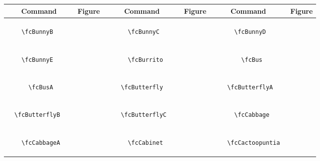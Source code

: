 \documentclass[x11names]{article}
\begin{document}
\begin{table}[H]\centering\begin{tabular}{|c|c|c|c|c|c|}\hline{\bf Command} & {\bf Figure} & {\bf Command} & {\bf Figure} & {\bf Command} & {\bf Figure}\\	\hline	&\multirow{5}{*}{	\fcBunnyB	[scale=0.4]} & &\multirow{5}{*}{	\fcBunnyC	[scale=0.4]} & &\multirow{5}{*}{	\fcBunnyD	[scale=0.4]}\\	& & & & & \\	& & & & & \\	\verb|	\fcBunnyB	| & & \verb|	\fcBunnyC	| & & \verb|	\fcBunnyD	| & \\	& & & & & \\	& & & & & \\	& & & & & \\	\hline									
		&\multirow{5}{*}{	\fcBunnyE	[scale=0.4]} & &\multirow{5}{*}{	\fcBurrito	[scale=0.4]} & &\multirow{5}{*}{	\fcBus	[scale=0.4]}\\	& & & & & \\	& & & & & \\	\verb|	\fcBunnyE	| & & \verb|	\fcBurrito	| & & \verb|	\fcBus	| & \\	& & & & & \\	& & & & & \\	& & & & & \\	\hline									
		&\multirow{5}{*}{	\fcBusA	[scale=0.4]} & &\multirow{5}{*}{	\fcButterfly	[scale=0.8]} & &\multirow{5}{*}{	\fcButterflyA	[scale=0.4]}\\	& & & & & \\	& & & & & \\	\verb|	\fcBusA	| & & \verb|	\fcButterfly	| & & \verb|	\fcButterflyA	| & \\	& & & & & \\	& & & & & \\	& & & & & \\	\hline									
		&\multirow{5}{*}{	\fcButterflyB	[scale=0.8]} & &\multirow{5}{*}{	\fcButterflyC	[scale=0.4]} & &\multirow{5}{*}{	\fcCabbage	[scale=0.4]}\\	& & & & & \\	& & & & & \\	\verb|	\fcButterflyB	| & & \verb|	\fcButterflyC	| & & \verb|	\fcCabbage	| & \\	& & & & & \\	& & & & & \\	& & & & & \\	\hline									
		&\multirow{5}{*}{	\fcCabbageA	[scale=0.4]} & &\multirow{5}{*}{	\fcCabinet	[scale=0.4]} & &\multirow{5}{*}{	\fcCactoopuntia	[scale=0.4]}\\	& & & & & \\	& & & & & \\	\verb|	\fcCabbageA	| & & \verb|	\fcCabinet	| & & \verb|	\fcCactoopuntia	| & \\	& & & & & \\	& & & & & \\	& & & & & \\	\hline									

\end{tabular}
\end{table}
\end{document}
